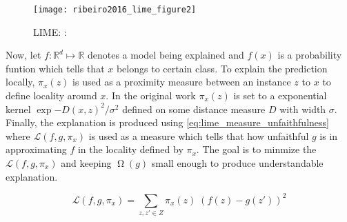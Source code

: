 \documentclass[english]{tktltiki2}
\theoremstyle{definition}
\theoremstyle{remark}
\newcommand{\onespace}{\;}
\begin{document}
\begin{wrapfigure}{r}{0.5\textwidth}
	\centering
	\vspace*{-2mm}
	\texttt{[image: ribeiro2016\_lime\_figure2]}
	\vspace*{-10mm}
	\caption{LIME: \citep{ribeiro2016should}: }
	\label{fig:ribeiro2016_lime_figure2}
\end{wrapfigure}

Now, let $f: \mathbb{R}^d \mapsto \mathbb{R}$ denotes a model being explained and $f(x)$ is a probability funtion which tells that $x$ belongs to certain class. To explain the prediction locally, $\pi_x(z)$ is used as a proximity measure between an instance $z$ to $x$ to define locality around $x$. In the original work \citep{ribeiro2016should} $\pi_x(z)$ is set to a exponential kernel $\exp{-D(x,z)^2/\sigma^2}$ defined on some distance measure $D$ with width $\sigma$.
Finally, the explanation is produced using \eqref{eq:lime_measure_unfaithfulness} where $\mathcal{L}(f, g, \pi_x)$ is used as a measure which tells that how unfaithful $g$ is in approximating $f$ in the locality defined by $\pi_x$. The goal is to minmize the $\mathcal{L}(f, g, \pi_x)$ and keeping $\upOmega(g)$ small enough to produce understandable explanation.

\begin{equation}\label{eq:lime_measure_unfaithfulness}
\mathcal{L}(f, g, \pi_x) = \sum_{z, z{'} \in Z} \pi_x(z)\onespace(f(z) - g(z'))^2
\end{equation}



\end{document}
